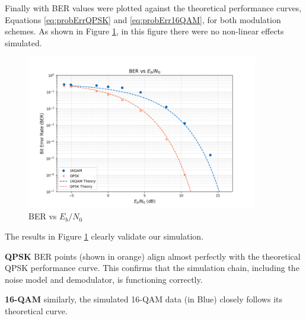 Finally with BER values were plotted against the theoretical performance curves, Equations \ref{eq:probErrQPSK} and \ref{eq:probErr16QAM}, for both modulation schemes. As shown in Figure \ref{fig:BER_SNR_a3_0}, in this figure there were no non-linear effects simulated.

\begin{figure}[H]
    \centering
    \includegraphics*[width=0.9\textwidth]{Images/BER_SNR_a3_0.png}
    \caption{BER vs $E_b/N_0$}
    \label{fig:BER_SNR_a3_0}
\end{figure}

The results in Figure \ref{fig:BER_SNR_a3_0} clearly validate our simulation.

\textbf{QPSK} BER points (shown in orange) align almost perfectly with the theoretical QPSK performance curve. This confirms that the simulation chain, including the noise model and demodulator, is functioning correctly.

\textbf{16-QAM} similarly, the simulated 16-QAM data (in Blue) closely follows its theoretical curve.


